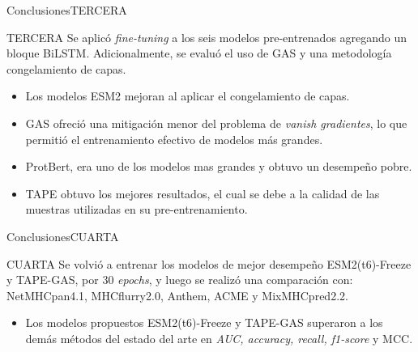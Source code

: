 \documentclass[10pt]{beamer}
\newcommand{\1}{
	\setbeamertemplate{background}{
		\texttt{[image: img/1]}
		\tikz[overlay] \fill[fill opacity=0.75,fill=white] (0,0) rectangle (-\paperwidth,\paperheight);
	}
}
\begin{document}
\begin{frame}{Conclusiones}{TERCERA}	
	\begin{block}{TERCERA}
		Se aplicó \textit{fine-tuning} a los seis modelos pre-entrenados agregando un bloque BiLSTM. Adicionalmente, se evaluó el uso de GAS y una metodología congelamiento de capas. \pause
		\begin{itemize}
			\item Los modelos ESM2 mejoran al aplicar el congelamiento de capas. \pause
			\item GAS ofreció una mitigación menor del problema de \textit{vanish gradientes}, lo que permitió el entrenamiento efectivo de modelos más grandes.
			\item ProtBert, era uno de los modelos mas grandes y obtuvo un desempeño pobre. \pause
			\item TAPE obtuvo los mejores resultados, el cual se debe a la calidad de las muestras utilizadas en su pre-entrenamiento.
		\end{itemize}			
	\end{block}	
\end{frame}

\begin{frame}{Conclusiones}{CUARTA}	
	\begin{block}{CUARTA}
		Se volvió a entrenar los modelos de mejor desempeño ESM2(t6)-Freeze y TAPE-GAS, por 30 \textit{epochs},  y luego se realizó una comparación con: NetMHCpan4.1, MHCflurry2.0, Anthem, ACME y MixMHCpred2.2. \pause
		\begin{itemize}
			\item Los modelos propuestos ESM2(t6)-Freeze y TAPE-GAS superaron a los demás métodos del estado del arte en \textit{AUC, accuracy, recall, f1-score} y MCC. 
		\end{itemize}			
	\end{block}	
\end{frame}
\end{document}
